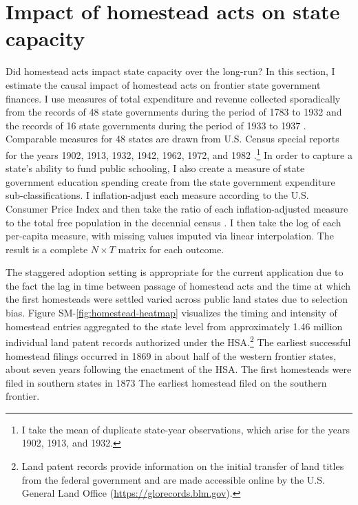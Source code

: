 \documentclass[12pt]{article}
\begin{document}
\section{Impact of homestead acts on state capacity} \label{state-capacity}

Did homestead acts impact state capacity over the long-run? In this section, I estimate the causal impact of homestead acts on frontier state government finances. I use measures of total expenditure and revenue collected sporadically from the records of 48 state governments during the period of 1783 to 1932 \citep{sylla1993sources} and the records of 16 state governments during the period of 1933 to 1937 \citep{sylla1995sourcesa,sylla1995sourcesb}. Comparable measures for 48 states are drawn from U.S. Census special reports for the years 1902, 1913, 1932, 1942, 1962, 1972, and 1982 \citep{haines2010}.\footnote{I take the mean of duplicate state-year observations, which arise for the years 1902, 1913, and 1932.} In order to capture a state's ability to fund public schooling, I also create a measure of state government education spending create from the state government expenditure sub-classifications. I inflation-adjust each measure according to the U.S. Consumer Price Index and then take the ratio of each inflation-adjusted measure to the total free population in the decennial census \citep{haines2010}. I then take the log of each per-capita measure, with missing values imputed via linear interpolation. The result is a complete $N \times T$ matrix for each outcome. 

The staggered adoption setting is appropriate for the current application due to the fact the lag in time between passage of homestead acts and the time at which the first homesteads were settled varied across public land states due to selection bias. Figure SM-\ref{fig:homestead-heatmap} visualizes the timing and intensity of homestead entries aggregated to the state level from approximately 1.46 million individual land patent records authorized under the HSA.\footnote{Land patent records provide information on the initial transfer of land titles from the federal government and are made accessible online by the U.S. General Land Office (\url{https://glorecords.blm.gov}).} The earliest successful homestead filings occurred in 1869 in about half of the western frontier states, about seven years following the enactment of the HSA. The first homesteads were filed in southern states in 1873 The earliest homestead filed on the southern frontier. 
\end{document}
